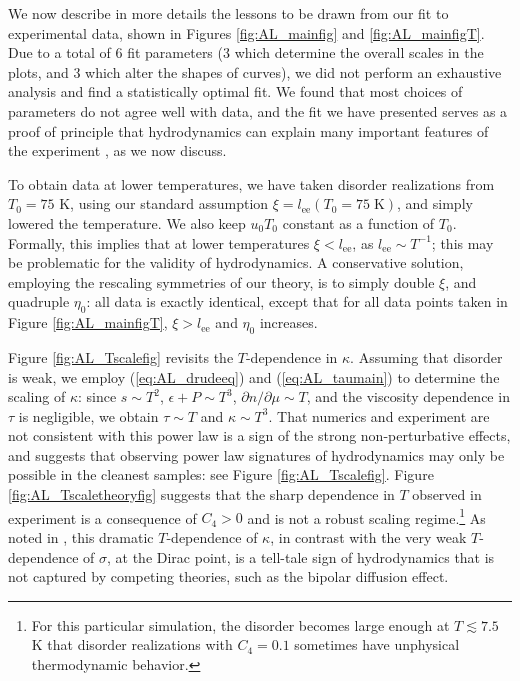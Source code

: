 We now describe in more details the lessons to be drawn from our fit to experimental data, shown in Figures \ref{fig:AL_mainfig} and \ref{fig:AL_mainfigT}.   Due to a total of 6 fit parameters (3 which determine the overall scales in the plots, and 3 which alter the shapes of curves),  we did not perform an exhaustive analysis and find a statistically optimal fit.   We found that most choices of parameters do not agree well with data, and the fit we have presented serves as a proof of principle that hydrodynamics can explain many important features of the experiment \cite{crossno_observation_2016}, as we now discuss. 

 To obtain data at lower temperatures, we have taken disorder realizations from $T_0=75$ K, using our standard assumption $\xi=l_{\mathrm{ee}}(T_0=75\; \mathrm{K})$, and simply lowered the temperature.  We also keep $u_0T_0$ constant as a function of $T_0$.  Formally, this implies that at lower temperatures $\xi<l_{\mathrm{ee}}$, as $l_{\mathrm{ee}}\sim T^{-1}$;  this may be problematic for the validity of hydrodynamics.    A conservative solution, employing the rescaling symmetries of our theory, is to simply double $\xi$,  and quadruple $\eta_0$:  all data is exactly identical, except that for all data points taken in Figure \ref{fig:AL_mainfigT},  $\xi>l_{\mathrm{ee}}$ and $\eta_0$ increases.

Figure \ref{fig:AL_Tscalefig} revisits the $T$-dependence in $\kappa$.  Assuming that disorder is weak, we employ (\ref{eq:AL_drudeeq}) and (\ref{eq:AL_taumain}) to determine the scaling of $\kappa$:  since  $s\sim T^2$, $\epsilon+P\sim T^3$, $\partial n/\partial \mu \sim T$, and the viscosity dependence in $\tau$ is negligible, we obtain $\tau \sim T$ and $\kappa \sim T^3$.   That numerics and experiment are not consistent with this power law is a sign of the strong non-perturbative effects, and suggests that observing  power law signatures of hydrodynamics may only be possible in the cleanest samples:
see Figure \ref{fig:AL_Tscalefig}.    Figure \ref{fig:AL_Tscaletheoryfig} suggests that the sharp dependence in $T$ observed in experiment is a consequence of $C_4>0$ and is not a robust scaling regime.\footnote{For this particular simulation, the disorder becomes large enough at $T\lesssim 7.5$ K that disorder realizations with $C_4=0.1$ sometimes have unphysical thermodynamic behavior.}  As noted in \cite{crossno_observation_2016}, this dramatic $T$-dependence of $\kappa$, in contrast with the very weak $T$-dependence of $\sigma$, at the Dirac point, is a tell-tale sign of hydrodynamics that is not captured by competing theories, such as the bipolar diffusion effect.
 


